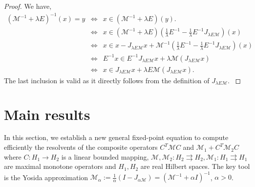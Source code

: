 \documentclass[11pt]{article}
\def\baqn{\begin{eqnarray*}}
\def\eaqn{\end{eqnarray*}}
\theoremstyle{plain}
\begin{document}
{\begin{proof}
{We have,
\baqn
(\mathcal{M}^{-1}+\lambda E)^{-1}(x)=y &\Leftrightarrow& x\in (\mathcal{M}^{-1}+\lambda E)(y).\\
&\Leftrightarrow&x\in (\mathcal{M}^{-1}+\lambda E)(\frac{1}{\lambda}E^{-1}-\frac{1}{\lambda}E^{-1}J_{\lambda E\mathcal{M}})(x)\\
&\Leftrightarrow& x\in x-J_{\lambda E\mathcal{M}}x+\mathcal{M}^{-1}(\frac{1}{\lambda}E^{-1}-\frac{1}{\lambda}E^{-1}J_{\lambda E\mathcal{M}})(x) \\
&\Leftrightarrow& E^{-1}x \in E^{-1}J_{\lambda E\mathcal{M}}x+ \lambda \mathcal{M} (J_{\lambda E\mathcal{M}}x) \\
&\Leftrightarrow& x\in J_{\lambda E\mathcal{M}}x+\lambda E\mathcal{M} (J_{\lambda E\mathcal{M}}x).
\eaqn
The last inclusion is valid as it directly follows from the definition of $J_{\lambda E\mathcal{M}}$.
}
\end{proof}
\section{Main results} \label{sec3}
In this section, we establish a new general fixed-point equation  to compute efficiently the resolvents of the composite operators  $C^T\mathcal{M}C$ and  $\mathcal{M}_1+C^T\mathcal{M}_2C$ where $C: H_1\to H_2$ is a linear bounded mapping, $\mathcal{M}, \mathcal{M}_2: H_2 \rightrightarrows H_2, \mathcal{M}_1:  H_1 \rightrightarrows H_1$ are maximal monotone operators and $H_1, H_2$ are real Hilbert spaces. The key tool is the   Yosida approximation $\mathcal{M}_\alpha:=\frac{1}{\alpha}(I-J_{\alpha \mathcal{M}})=(\mathcal{M}^{-1}+\alpha I)^{-1}$, $\alpha>0$. 
}
\end{document}
